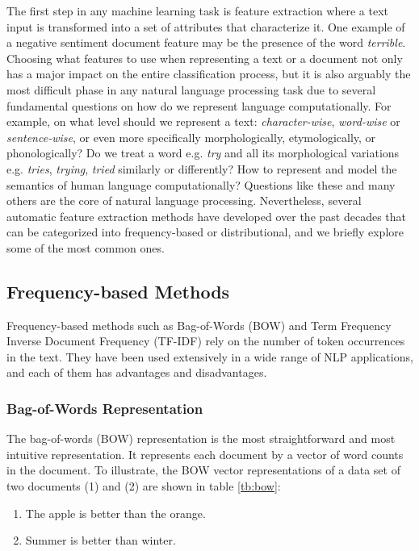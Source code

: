 The first step in any machine learning task is feature extraction where a text input is transformed into a set of attributes that characterize it. One example of a negative sentiment document feature may be the presence of the word \emph{terrible}. Choosing what features to use when representing a text or a document not only has a major impact on the entire classification process, but it is also arguably the most difficult phase in any natural language processing task due to several fundamental questions on how do we represent language computationally. For example, on what level should we represent a text: \emph{character-wise}, \emph{word-wise} or \emph{sentence-wise}, or even more specifically morphologically, etymologically, or phonologically? Do we treat a word e.g. \emph{try} and all its morphological variations e.g. \emph{tries}, \emph{trying}, \emph{tried} similarly or differently? How to represent and model the semantics of human language computationally? Questions like these and many others are the core of natural language processing. Nevertheless, several automatic feature extraction methods have developed over the past decades that can be categorized into frequency-based or distributional, and we briefly explore some of the most common ones.

\subsection{Frequency-based Methods}

Frequency-based methods such as Bag-of-Words (BOW) and Term Frequency Inverse Document Frequency (TF-IDF) rely on the number of token occurrences in the text\citet{jurafsky2014speech}. They have been used extensively in a wide range of NLP applications, and each of them has advantages and disadvantages. 
\subsubsection*{Bag-of-Words Representation}

The bag-of-words (BOW) representation is the most straightforward and most intuitive
representation. It represents each document by a vector of word counts in the document.  To illustrate, the BOW vector representations of a data set of two documents (1) and (2) are shown in table \ref{tb:bow}:

\begin{enumerate}
\item The apple is better than the orange.
\item Summer is better than winter. 
\end{enumerate}




